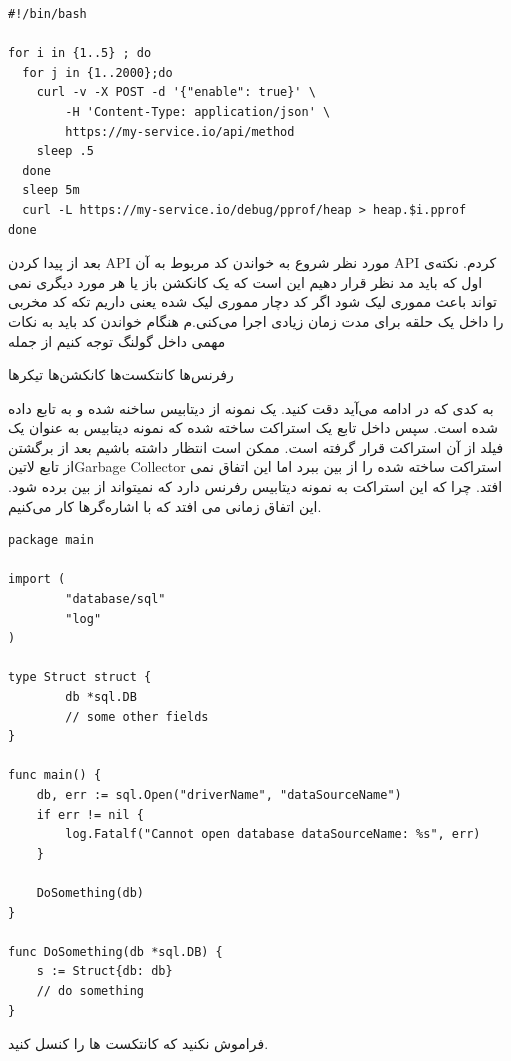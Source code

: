 \documentclass[a4]{report}
\begin{document}
\begin{latin}
\begin{verbatim}
#!/bin/bash

for i in {1..5} ; do
  for j in {1..2000};do
    curl -v -X POST -d '{"enable": true}' \
        -H 'Content-Type: application/json' \
        https://my-service.io/api/method
    sleep .5
  done
  sleep 5m
  curl -L https://my-service.io/debug/pprof/heap > heap.$i.pprof
done
\end{verbatim}
\end{latin}

بعد از پیدا کردن API مورد نظر شروع به خواندن کد مربوط به آن API کردم. نکته‌ی اول که باید مد نظر قرار دهیم این است که یک کانکشن باز یا هر مورد دیگری نمی تواند باعث مموری لیک شود
اگر کد دچار مموری لیک شده یعنی داریم تکه کد مخربی را داخل یک حلقه برای مدت زمان زیادی اجرا می‌کنی.م هنگام خواندن کد باید به نکات مهمی داخل گولنگ توجه کنیم از جمله

\شروع{شمارش}
 رفرنس‌ها
 کانتکست‌ها
\فقره کانکشن‌ها
\فقره تیکرها

به کدی که در ادامه می‌آید دقت کنید. یک نمونه از دیتابیس ساخنه شده و به تابع داده شده است. سپس داخل تابع یک استراکت ساخته شده که نمونه دیتابیس به عنوان یک فیلد از آن استراکت قرار گرفته است.
ممکن است انتظار داشته باشیم بعد از برگشتن از تابع ‌لاتین{Garbage Collector} استراکت ساخته شده را از بین ببرد اما این اتفاق نمی افتد.
چرا که این استراکت به نمونه دیتابیس رفرنس دارد که نمیتواند از بین برده شود. این اتفاق زمانی می افتد که با اشاره‌گرها کار می‌کنیم.

\begin{latin}
\begin{verbatim}
package main

import (
        "database/sql"
        "log"
)

type Struct struct {
        db *sql.DB
        // some other fields
}

func main() {
    db, err := sql.Open("driverName", "dataSourceName")
    if err != nil {
        log.Fatalf("Cannot open database dataSourceName: %s", err)
    }

    DoSomething(db)
}

func DoSomething(db *sql.DB) {
    s := Struct{db: db}
    // do something
}
\end{verbatim}
\end{latin}

فراموش نکنید که کانتکست ها را کنسل کنید.
\end{document}
